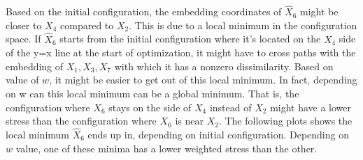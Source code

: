 \documentclass[11pt]{article} %
\begin{document}
   Based on the initial configuration, the  embedding coordinates of $\hat{X}_6$ might be closer
    to $X_4$ compared to $X_2$. This is due to a local minimum in the configuration space.  If $\hat{X}_6$ starts from the initial configuration where it's located on the $X_4$ side of the y=x line at the start of optimization, 
    it might have to cross paths with the embedding of  ${X}_1,{X}_3,{X}_7$ with which it has a  nonzero dissimilarity.  
    Based on value of $w$, it might be easier to get out of this local minimum. 
    In fact, depending on w can this  local minimum can be a global minimum. 
    That is, the configuration where $X_6$ stays on the side of $X_4$ instead of $X_2$ might have a lower stress than the configuration where $X_6$ is near $X_2$. 
    The following plots shows the local minimum $\hat{X}_6$ ends up in, depending on initial configuration. 
    Depending on $w$ value, one of these minima has a lower weighted stress than the other.   
\end{document}
